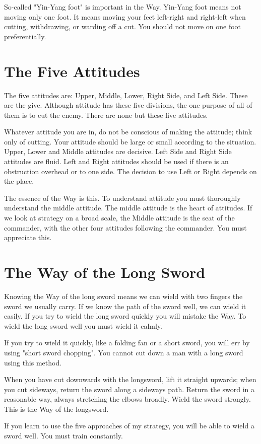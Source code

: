 \documentclass[12pt]{report}
\begin{document}
So-called "Yin-Yang foot" is important in the Way. Yin-Yang foot means not moving only one foot. It means moving your feet left-right and right-left when cutting, withdrawing, or warding off a cut. You should not move on one foot preferentially.
\section*{The Five Attitudes}
The five attitudes are: Upper, Middle, Lower, Right Side, and Left Side. These are the give. Although attitude has these five divisions, the one purpose of all of them is to cut the enemy. There are none but these five attitudes.

Whatever attitude you are in, do not be conscious of making the attitude; think only of cutting. Your attitude should be large or small according to the situation. Upper, Lower and Middle attitudes are decisive. Left Side and Right Side attitudes are fluid. Left and Right attitudes should be used if there is an obstruction overhead or to one side. The decision to use Left or Right depends on the place.

The essence of the Way is this. To understand attitude you must thoroughly understand the middle attitude. The middle attitude is the heart of attitudes. If we look at strategy on a broad scale, the Middle attitude is the seat of the commander, with the other four attitudes following the commander. You must appreciate this.
\section*{The Way of the Long Sword}
Knowing the Way of the long sword means we can wield with two fingers the sword we usually carry. If we know the path of the sword well, we can wield it easily. If you try to wield the long sword quickly you will mistake the Way. To wield the long sword well you must wield it calmly.

If you try to wield it quickly, like a folding fan or a short sword, you will err by using "short sword chopping". You cannot cut down a man with a long sword using this method.

When you have cut downwards with the longsword, lift it straight upwards; when you cut sideways, return the sword along a sideways path. Return the sword in a reasonable way, always stretching the elbows broadly. Wield the sword strongly. This is the Way of the longsword.

If you learn to use the five approaches of my strategy, you will be able to wield a sword well. You must train constantly.
\end{document}
